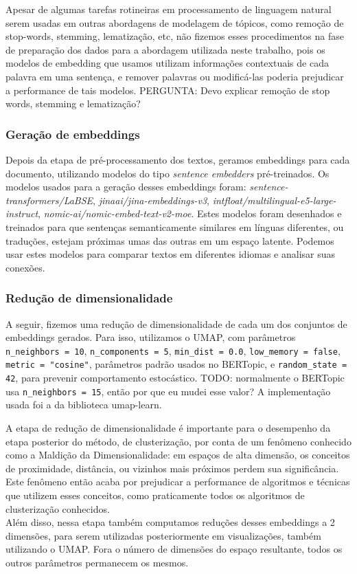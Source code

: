 Apesar de algumas tarefas rotineiras em processamento de linguagem natural serem usadas em outras abordagens de modelagem de tópicos, como remoção de stop-words, stemming, lematização, etc, não fizemos esses procedimentos na fase de preparação dos dados para a abordagem utilizada neste trabalho, pois os modelos de embedding que usamos utilizam informações contextuais de cada palavra em uma sentença, e remover palavras ou modificá-las poderia prejudicar a performance de tais modelos. PERGUNTA: Devo explicar remoção de stop words, stemming e lematização?

\subsubsection{Geração de embeddings}
Depois da etapa de pré-processamento dos textos, geramos embeddings para cada documento, utilizando modelos do tipo \textit{sentence embedders} pré-treinados. Os modelos usados para a geração desses embeddings foram: \textit{sentence-transformers/LaBSE}, \textit{jinaai/jina-embeddings-v3}, \textit{intfloat/multilingual-e5-large-instruct}, \textit{nomic-ai/nomic-embed-text-v2-moe}. Estes modelos foram desenhados e treinados para que sentenças semanticamente similares em línguas diferentes, ou traduções, estejam próximas umas das outras em um espaço latente. Podemos usar estes modelos para comparar textos em diferentes idiomas e analisar suas conexões.

\subsubsection{Redução de dimensionalidade}
A seguir, fizemos uma redução de dimensionalidade de cada um dos conjuntos de embeddings gerados.
Para isso, utilizamos o UMAP, com parâmetros \verb|n_neighbors = 10|, \verb|n_components = 5|, \verb|min_dist = 0.0|, \verb|low_memory = false|, \verb|metric = "cosine"|, parâmetros padrão usados no BERTopic, e \verb|random_state = 42|, para prevenir comportamento estocástico. TODO: normalmente o BERTopic usa \verb|n_neighbors = 15|, então por que eu mudei esse valor?
A implementação usada foi a da biblioteca umap-learn.

A etapa de redução de dimensionalidade é importante para o desempenho da etapa posterior do método, de clusterização, por conta de um fenômeno conhecido como a Maldição da Dimensionalidade: em espaços de alta dimensão, os conceitos de proximidade, distância, ou vizinhos mais próximos perdem sua significância. Este fenômeno então acaba por prejudicar a performance de algoritmos e técnicas que utilizem esses conceitos, como praticamente todos os algoritmos de clusterização conhecidos.\\
Além disso, nessa etapa também computamos reduções desses embeddings a 2 dimensões, para serem utilizadas posteriormente em visualizações, também utilizando o UMAP. Fora o número de dimensões do espaço resultante, todos os outros parâmetros permanecem os mesmos.

